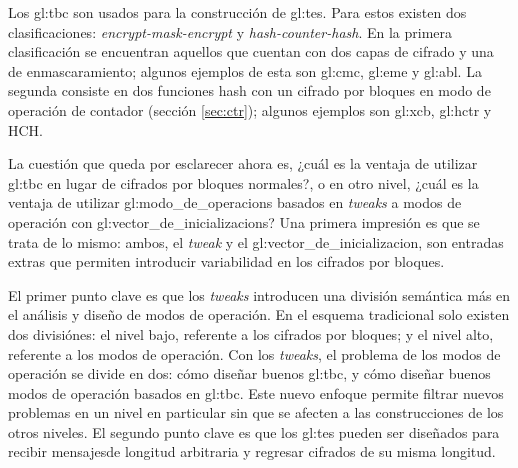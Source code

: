 Los \gls{gl:tbc} son usados para la construcción de \gls{gl:tes}. Para estos
existen dos clasificaciones: \textit{encrypt-mask-encrypt} y
\textit{hash-counter-hash}. En la primera clasificación se encuentran aquellos
que cuentan con dos capas de cifrado y una de enmascaramiento; algunos ejemplos
de esta son \gls{gl:cmc}, \gls{gl:eme} y \gls{gl:abl}. La segunda consiste en
dos funciones hash con un cifrado por bloques en modo de operación de contador
(sección \ref{sec:ctr}); algunos ejemplos son \gls{gl:xcb}, \gls{gl:hctr}
y HCH.


La cuestión que queda por esclarecer ahora es, ¿cuál es la ventaja de utilizar
\gls{gl:tbc} en lugar de cifrados por bloques normales?, o en otro nivel,
¿cuál es la ventaja de utilizar \glspl{gl:modo_de_operacion} basados en
\textit{tweaks} a modos de operación con \glspl{gl:vector_de_inicializacion}?
Una primera impresión es que se trata de lo mismo: ambos, el \textit{tweak} y
el \gls{gl:vector_de_inicializacion}, son entradas extras que permiten
introducir variabilidad en los cifrados por bloques.

El primer punto clave es que los \textit{tweaks} introducen una división
semántica más en el análisis y diseño de modos de operación. En el esquema
tradicional solo existen dos divisiónes: el nivel bajo, referente a los
cifrados por bloques; y el nivel alto, referente a los modos de operación. Con
los \textit{tweaks}, el problema de los modos de operación se divide en dos:
cómo diseñar buenos \gls{gl:tbc}, y cómo diseñar buenos modos de operación
basados en \gls{gl:tbc}. Este nuevo enfoque permite filtrar nuevos problemas
en un nivel en particular sin que se afecten a las construcciones de los otros
niveles. El segundo punto clave es que los \gls{gl:tes} pueden ser diseñados
para recibir mensajesde longitud arbitraria y regresar cifrados de su misma
longitud.
